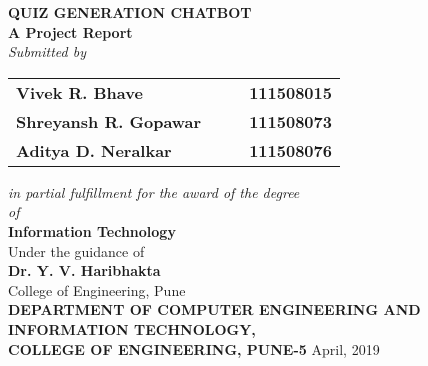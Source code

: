 \begin{titlepage}
\begin{center}
\LARGE{\bf{QUIZ GENERATION CHATBOT\\}}	%
\Large{\bf{A Project Report\\}}		%
\Large{\em{Submitted by\\}}
\begin{table}[htbp]
	\begin{center}
	\begin{tabular}{ l c c l }
	\Large\bf{Vivek R. Bhave} & & & \Large\bf{111508015} \\[0.3cm] 
	\Large\bf{Shreyansh R. Gopawar} & & & \Large\bf{111508073} \\[0.3cm]
	\Large\bf{Aditya D. Neralkar} & & & \Large\bf{111508076} \\
	\end{tabular}
	\end{center}
	\end{table}
\Large{\em{in partial fulfillment for the award of the degree\\ \vspace{1.5pt}of\\}}
\LARGE{\bf{Information Technology\\}}%
\Large{Under the guidance of\\ }
\Large{\bf{Dr. Y. V. Haribhakta}\\}
\Large{College of Engineering, Pune\\}
\Large{\bf{DEPARTMENT OF COMPUTER ENGINEERING AND \\INFORMATION TECHNOLOGY,\\ 
COLLEGE OF ENGINEERING, PUNE-5}}
\vfill
\large{April, 2019}
\end{center}
\end{titlepage}
